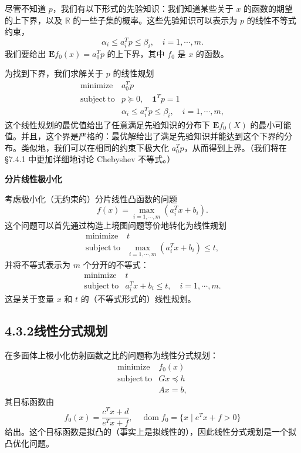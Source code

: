 \documentclass[UTF8, 12pt, fontset=fandol, oneside]{ctexart}
\begin{document}
尽管不知道 $p$，我们有以下形式的先验知识：我们知道某些关于 $x$ 的函数的期望的上下界，以及 $\mathbb{R}$ 的一些子集的概率。这些先验知识可以表示为 $p$ 的线性不等式约束，
\[
\alpha_i\leq a_i^Tp\leq \beta_i,\quad i=1,\cdots,m.
\]
我们要给出 $\mathbf{E}f_0(x)=a_0^Tp$ 的上下界，其中 $f_0$ 是 $x$ 的函数。

为找到下界，我们求解关于 $p$ 的线性规划
\[
\begin{array}{ll}
\mathop{\mathrm{minimize}} & a_0^Tp\\
\mathrm{subject\ to} & p\succeq 0,\quad \mathbf{1}^Tp=1\\
& \alpha_i\leq a_i^Tp\leq \beta_i,\quad i=1,\cdots,m,
\end{array}
\]
这个线性规划的最优值给出了任意满足先验知识的分布下 $\mathbf{E}f_0(X)$ 的最小可能值。并且，这个界是严格的：最优解给出了满足先验知识并能达到这个下界的分布。类似地，我们可以在相同的约束下极大化 $a_0^Tp$，从而得到上界。（我们将在 §7.4.1 中更加详细地讨论 Chebyshev 不等式。）

\noindent\textbf{分片线性极小化}

考虑极小化（无约束的）分片线性凸函数的问题
\[
f(x)=\max_{i=1,\cdots,m}(a_i^Tx+b_i).
\]
这个问题可以首先通过构造上境图问题等价地转化为线性规划
\[
\begin{array}{ll}
\mathop{\mathrm{minimize}} & t\\
\mathrm{subject\ to} & \max_{i=1,\cdots,m}(a_i^Tx+b_i)\leq t,
\end{array}
\]
并将不等式表示为 $m$ 个分开的不等式：
\[
\begin{array}{ll}
\mathop{\mathrm{minimize}} & t\\
\mathrm{subject\ to} & a_i^Tx+b_i\leq t,\quad i=1,\cdots,m.
\end{array}
\]
这是关于变量 $x$ 和 $t$ 的（不等式形式的）线性规划。

\subsection*{4.3.2\quad 线性分式规划}

在多面体上极小化仿射函数之比的问题称为线性分式规划：
\begin{equation}
\begin{array}{ll}
\mathop{\mathrm{minimize}} & f_0(x)\\
\mathrm{subject\ to} & Gx\preceq h\\
& Ax=b,
\end{array}
\tag{4.32}
\end{equation}
其目标函数由
\[
f_0(x)=\frac{c^Tx+d}{e^Tx+f},\quad
\operatorname{dom} f_0=\{x\mid e^Tx+f>0\}
\]
给出。这个目标函数是拟凸的（事实上是拟线性的），因此线性分式规划是一个拟凸优化问题。
\end{document}
